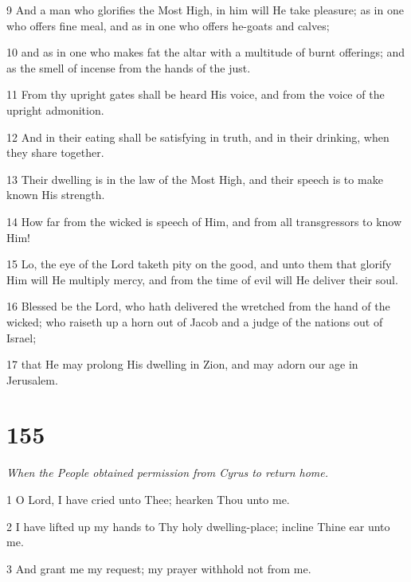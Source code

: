 \par 9 And a man who glorifies the Most High, in him will He take pleasure; as in one who offers fine meal, and as in one who offers he-goats and calves; 

\par 10 and as in one who makes fat the altar with a multitude of burnt offerings; and as the smell of incense from the hands of the just. 

\par 11 From thy upright gates shall be heard His voice, and from the voice of the upright admonition. 

\par 12 And in their eating shall be satisfying in truth, and in their drinking, when they share together. 

\par 13 Their dwelling is in the law of the Most High, and their speech is to make known His strength. 

\par 14 How far from the wicked is speech of Him, and from all transgressors to know Him! 

\par 15 Lo, the eye of the Lord taketh pity on the good, and unto them that glorify Him will He multiply mercy, and from the time of evil will He deliver their soul. 

\par 16 Blessed be the Lord, who hath delivered the wretched from the hand of the wicked; who raiseth up a horn out of Jacob and a judge of the nations out of Israel; 

\par 17 that He may prolong His dwelling in Zion, and may adorn our age in Jerusalem.

\chapter{155}

\par \textit{When the People obtained permission from Cyrus to return home.}

\par 1 O Lord, I have cried unto Thee; hearken Thou unto me. 

\par 2 I have lifted up my hands to Thy holy dwelling-place; incline Thine ear unto me. 

\par 3 And grant me my request; my prayer withhold not from me. 

